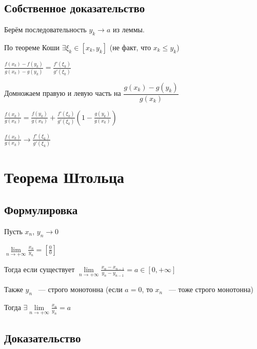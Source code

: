 \documentclass{article}
\begin{document}
		\subsection{Собственное доказательство}
		
			Берём последовательность $y_k \rightarrow a$ из леммы.
			
			По теореме Коши $\exists \xi_k \in [x_k, y_k]$ (не факт, что $x_k \leq y_k$)
			
			$\frac{f(x_k) - f(y_k)}{g(x_k) - g(y_k)} = \frac{f'(\xi_k)}{g'(\xi_k)}$
			
			Домножаем правую и левую часть на $\dfrac{g(x_k) - g(y_k)}{g(x_k)}$
			
			$\frac{f(x_k)}{g(x_k)} = \frac{f(y_k)}{g(x_k)} + \frac{f'(\xi_k)}{g'(\xi_k)} \left( 1 - \frac{g(y_k)}{g(x_k)} \right)$
			
			$\frac{f(x_k)}{g(x_k)} \rightarrow \frac{f'(\xi_k)}{g'(\xi_k)}$
			
	\newpage
	
	\section{Теорема Штольца}
	
		\subsection{Формулировка}
		
			Пусть $x_n$, $y_n \rightarrow 0$
			
			$\lim\limits_{n \rightarrow +\infty} \frac{x_n}{y_n} = \left[ \frac{0}{0} \right]$
			
			Тогда если существует $\lim\limits_{n \rightarrow +\infty} \frac{x_n - x_{n - 1}}{y_n - y_{n - 1}} = a \in [0, +\infty]$
			
			Также $y_n$ ~--- строго монотонна (если $a = 0$, то $x_n$ ~--- тоже строго монотонна)
			
			Тогда $\exists \lim\limits_{n \rightarrow +\infty} \frac{x_n}{y_n} = a$
			
		\subsection{Доказательство}
		
\end{document}
